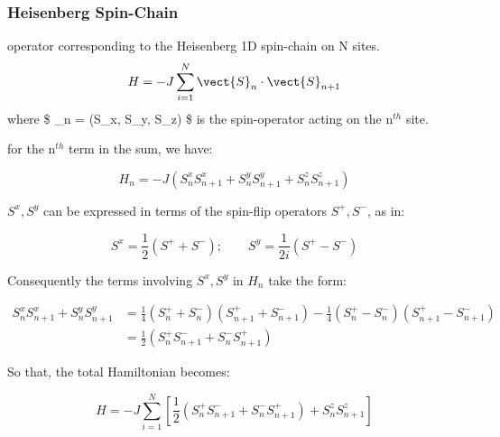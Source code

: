 \documentclass{article}
\begin{document}
    \subsubsection{Heisenberg Spin-Chain}\label{heisenberg-spin-chain}

operator corresponding to the Heisenberg 1D spin-chain on N sites.
\[ H = - J \sum_{i=1}^N \vect{S}_n \cdot \vect{S}_{n+1} \] where \$
\_n = (S\_x, S\_y, S\_z) \$ is the spin-operator acting on the
n\({}^{th}\) site.

for the n\({}^{th}\) term in the sum, we have:

\[ H_n = -J ( S_n^x S_{n+1}^x + S_n^y S_{n+1}^y + S_n^z S_{n+1}^z ) \]

\(S^x, S^y\) can be expressed in terms of the spin-flip operators
\(S^+, S^-\), as in:

\[ S^x = \frac{1}{2}(S^+ + S^-); \qquad S^y = \frac{1}{2i}(S^+ - S^-) \]

Consequently the terms involving \(S^x, S^y\) in \(H_n\) take the form:

\begin{align}
    S_n^x S_{n+1}^x + S_n^y S_{n+1}^y & = \frac{1}{4}(S_n^+ + S_n^-) (S_{n+1}^+ + S_{n+1}^-) - \frac{1}{4}(S_n^+ - S_n^-) (S_{n+1}^+ - S_{n+1}^-) \\
            & = \frac{1}{2} (S_n^+ S_{n+1}^- + S_n^- S_{n+1}^+)
\end{align}

So that, the total Hamiltonian becomes:

\[ H = -J \sum_{i=1}^N \left[ \frac{1}{2} (S_n^+ S_{n+1}^- + S_n^- S_{n+1}^+) + S_n^z S_{n+1}^z \right] \]
\end{document}
